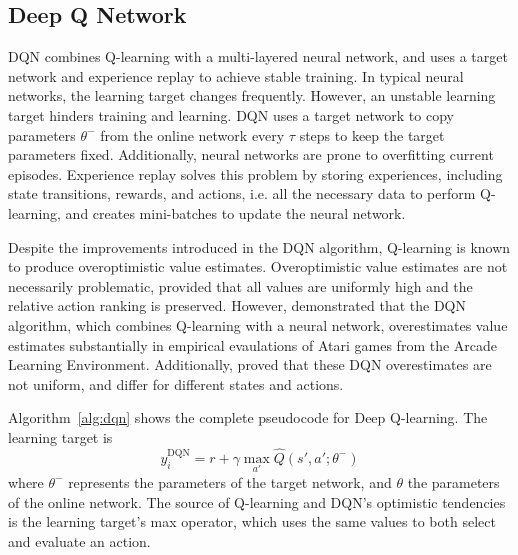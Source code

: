\documentclass{article}
\begin{document}
\subsection{Deep Q Network}
DQN combines Q-learning with a multi-layered neural network, and uses a target
network and experience replay to achieve stable training. In typical neural
networks, the learning target changes frequently. However, an unstable learning
target hinders training and learning. DQN uses a target network to copy
parameters $\theta^-$ from the online network every $\tau$ steps to keep the
target parameters fixed.  Additionally, neural networks are prone to overfitting
current episodes. Experience replay solves this problem by storing experiences,
including state transitions, rewards, and actions, i.e. all the necessary data
to perform Q-learning, and creates mini-batches to update the neural network.

Despite the improvements introduced in the DQN algorithm, Q-learning is known to
produce overoptimistic value estimates. Overoptimistic value estimates are not
necessarily problematic, provided that all values are uniformly high and the
relative action ranking is preserved. However, \citet{van2016deep} demonstrated
that the DQN algorithm, which combines Q-learning with a neural network,
overestimates value estimates substantially in empirical evaulations of Atari
games from the Arcade Learning Environment. Additionally, \citet{van2016deep}
proved that these DQN overestimates are not uniform, and differ for different
states and actions.

Algorithm~\ref{alg:dqn} shows the complete pseudocode for Deep Q-learning. The
learning target is
\begin{equation}\label{eq:dqn}
    y_i^{\text{DQN}} = r + \gamma \max_{a'} \hat{Q}(s', a'; \theta^-)    
\end{equation}
where $\theta^-$ represents the parameters of the target network, and $\theta$
the parameters of the online network. The source of Q-learning and DQN's
optimistic tendencies is the learning target's max operator, which uses the same
values to both select and evaluate an action.
\end{document}
